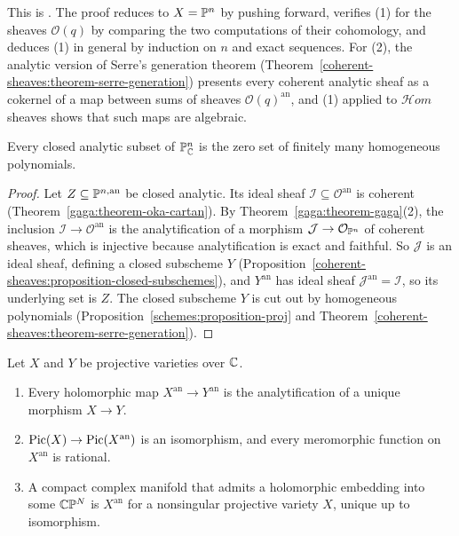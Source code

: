 This is \cite[Th\'eor\`emes 1--3]{serre-gaga}. The proof reduces to $X = \mathbb{P}^n$ by pushing forward, verifies (1) for the sheaves $\mathcal{O}(q)$ by comparing the two
computations of their cohomology, and deduces (1) in general by induction on $n$ and exact sequences. For (2), the analytic version of Serre's generation theorem
(Theorem~\ref{coherent-sheaves:theorem-serre-generation}) presents every coherent analytic sheaf as a cokernel of a map between sums of sheaves $\mathcal{O}(q)^{\mathrm{an}}$,
and (1) applied to $\mathcal{H}om$ sheaves shows that such maps are algebraic.

\begin{corollary}\label{gaga:corollary-chow}
Every closed analytic subset of $\mathbb{P}^n_{\mathbb{C}}$ is the zero set of finitely many homogeneous polynomials.
\end{corollary}

\begin{proof}
Let $Z \subseteq \mathbb{P}^{n,\mathrm{an}}$ be closed analytic. Its ideal sheaf $\mathcal{I} \subseteq \mathcal{O}^{\mathrm{an}}$ is coherent (Theorem~\ref{gaga:theorem-oka-cartan}). By
Theorem~\ref{gaga:theorem-gaga}(2), the inclusion $\mathcal{I} \to \mathcal{O}^{\mathrm{an}}$ is the analytification of a morphism $\mathcal{J} \to \mathcal{O}_{\mathbb{P}^n}$ of coherent sheaves,
which is injective because analytification is exact and faithful. So $\mathcal{J}$ is an ideal sheaf, defining a closed subscheme $Y$
(Proposition~\ref{coherent-sheaves:proposition-closed-subschemes}), and $Y^{\mathrm{an}}$ has ideal sheaf $\mathcal{J}^{\mathrm{an}} = \mathcal{I}$, so its underlying set is $Z$. The
closed subscheme $Y$ is cut out by homogeneous polynomials (Proposition~\ref{schemes:proposition-proj} and Theorem~\ref{coherent-sheaves:theorem-serre-generation}).
\end{proof}

\begin{corollary}\label{gaga:corollary-consequences}
Let $X$ and $Y$ be projective varieties over $\mathbb{C}$.
\begin{enumerate}
\item Every holomorphic map $X^{\mathrm{an}} \to Y^{\mathrm{an}}$ is the analytification of a unique morphism $X \to Y$.
\item $\operatorname{Pic}(X) \to \operatorname{Pic}(X^{\mathrm{an}})$ is an isomorphism, and every meromorphic function on $X^{\mathrm{an}}$ is rational.
\item A compact complex manifold that admits a holomorphic embedding into some $\mathbb{C}\mathbb{P}^N$ is $X^{\mathrm{an}}$ for a nonsingular projective variety $X$, unique up to
isomorphism.
\end{enumerate}
\end{corollary}

